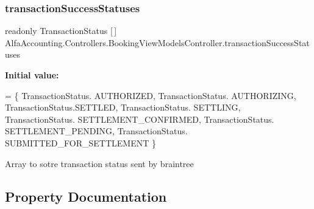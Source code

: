 \subsubsection{\texorpdfstring{transaction\+Success\+Statuses}{transactionSuccessStatuses}}
{\footnotesize\ttfamily readonly Transaction\+Status \mbox{[}$\,$\mbox{]} Alfa\+Accounting.\+Controllers.\+Booking\+View\+Models\+Controller.\+transaction\+Success\+Statuses\hspace{0.3cm}{\ttfamily [static]}}

{\bfseries Initial value\+:}
\begin{DoxyCode}
= \{
                                                                                    TransactionStatus.
      AUTHORIZED,
                                                                                    TransactionStatus.
      AUTHORIZING,
                                                                             TransactionStatus.SETTLED,
                                                                                    TransactionStatus.
      SETTLING,
                                                                                    TransactionStatus.
      SETTLEMENT\_CONFIRMED,
                                                                                    TransactionStatus.
      SETTLEMENT\_PENDING,
                                                                                    TransactionStatus.
      SUBMITTED\_FOR\_SETTLEMENT
                                                                                \}
\end{DoxyCode}


Array to sotre transaction status sent by braintree 



\subsection{Property Documentation}
\mbox{\label{class_alfa_accounting_1_1_controllers_1_1_booking_view_models_controller_acc8f9d52de1f1e047284bab3a03de617}} 
